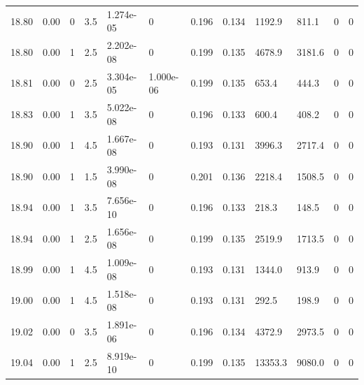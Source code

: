 \documentclass[preview]{standalone}
\begin{document}
{{{{{{{{{{{{{{{{{{{\begin{tabular}{L{1.2cm}C{1.2cm} C{0.3cm}C{0.5cm} C{1.4cm}C{1.4cm} C{1.4cm}C{1.4cm} C{1.6cm}C{1.6cm} C{1.6cm}C{1.6cm}}
  18.80  &  0.00  & 0     & 3.5 &  1.274e-05  & 0  &  0.196&   0.134& 1192.9 & 811.1   &  0 & 0  \\ 
  18.80  &  0.00  & 1     & 2.5 &  2.202e-08  & 0  &  0.199&   0.135& 4678.9 & 3181.6   &  0 & 0  \\ 
  18.81  &  0.00  & 0     & 2.5 &  3.304e-05  & 1.000e-06  &  0.199&   0.135& 653.4 & 444.3   &  0 & 0  \\ 
  18.83  &  0.00  & 1     & 3.5 &  5.022e-08  & 0  &  0.196&   0.133& 600.4 & 408.2   &  0 & 0  \\ 
  18.90  &  0.00  & 1     & 4.5 &  1.667e-08  & 0  &  0.193&   0.131& 3996.3 & 2717.4   &  0 & 0  \\ 
  18.90  &  0.00  & 1     & 1.5 &  3.990e-08  & 0  &  0.201&   0.136& 2218.4 & 1508.5   &  0 & 0  \\ 
  18.94  &  0.00  & 1     & 3.5 &  7.656e-10  & 0  &  0.196&   0.133& 218.3 & 148.5   &  0 & 0  \\ 
  18.94  &  0.00  & 1     & 2.5 &  1.656e-08  & 0  &  0.199&   0.135& 2519.9 & 1713.5   &  0 & 0  \\ 
  18.99  &  0.00  & 1     & 4.5 &  1.009e-08  & 0  &  0.193&   0.131& 1344.0 & 913.9   &  0 & 0  \\ 
  19.00  &  0.00  & 1     & 4.5 &  1.518e-08  & 0  &  0.193&   0.131& 292.5 & 198.9   &  0 & 0  \\ 
  19.02  &  0.00  & 0     & 3.5 &  1.891e-06  & 0  &  0.196&   0.134& 4372.9 & 2973.5   &  0 & 0  \\ 
  19.04  &  0.00  & 1     & 2.5 &  8.919e-10  & 0  &  0.199&   0.135& 13353.3 & 9080.0   &  0 & 0  \\ 
\hline 
\end{tabular} 

}}}}}}}}}}}}}}}}}}}
\end{document}
